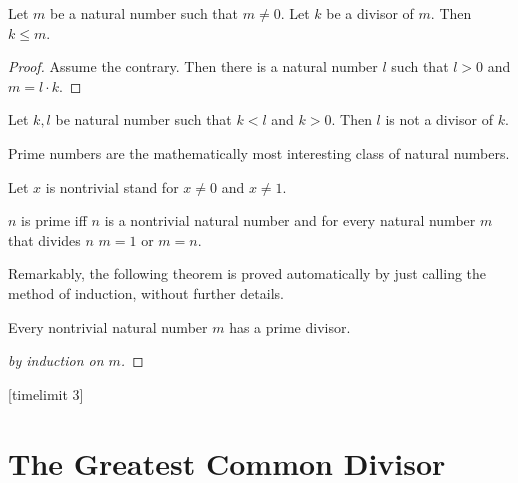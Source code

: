 \documentclass{article}
\begin{document}
\begin{forthel}
\begin{lemma}
Let $m$ be a natural number such that $m \neq 0$.
Let $k$ be a divisor of $m$.
Then $k \leq m$.
\end{lemma}
\begin{proof}
Assume the contrary.
Then there is a natural number $l$ such that
$l > 0$ and $m = l \cdot k$.
\end{proof}

\begin{proposition}
Let $k,l$ be natural number such that $k < l$ and $k > 0$.
Then $l$ is not a divisor of $k$.
\end{proposition}

\end{forthel}
%
Prime numbers are the mathematically most interesting
class of natural numbers.
%
\begin{forthel}
Let $x$ is nontrivial stand for $x \neq 0$ and $x \neq 1$.

\begin{definition}
$n$ is prime iff $n$ is a nontrivial natural number and
for every natural number $m$ that divides $n$ $m = 1$ or $m = n$.
\end{definition}
\end{forthel}
%
Remarkably, the following theorem is proved automatically by
just calling the method of induction, without further details.
%
\begin{forthel}
[timelimit 10]
\begin{theorem}
Every nontrivial natural number $m$ has a prime divisor.
\end{theorem}
\begin{proof}[by induction on $m$]
\end{proof}
[timelimit 3]
\end{forthel}

\section{The Greatest Common Divisor}
\end{document}

